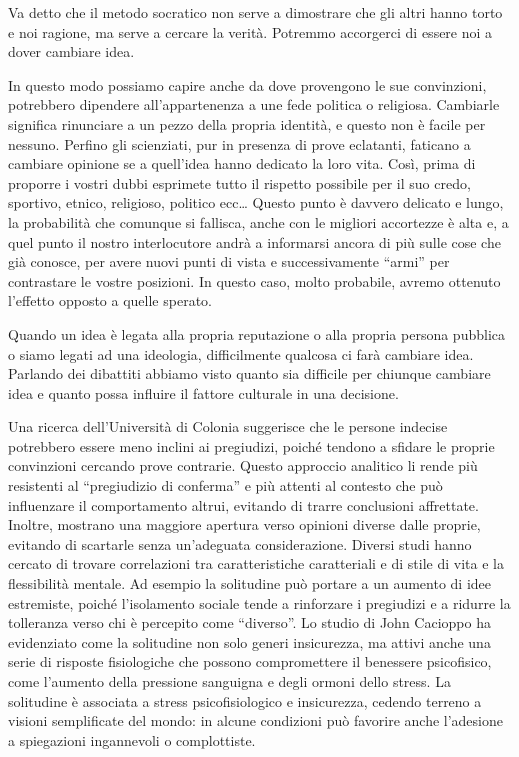 \documentclass[12pt]{book} %
\begin{document}
Va detto che il metodo socratico non serve a dimostrare che gli altri hanno torto e noi ragione, ma serve a cercare la
verità. Potremmo accorgerci di essere noi a dover cambiare idea.

In questo modo possiamo capire anche da dove provengono le sue convinzioni, potrebbero dipendere
all'appartenenza a une fede politica o religiosa. Cambiarle significa rinunciare a un pezzo della
propria identità, e questo non è facile per nessuno. Perfino gli scienziati, pur in presenza di prove eclatanti,
faticano a cambiare opinione se a quell'idea hanno dedicato la loro vita. Così, prima di proporre
i vostri dubbi esprimete tutto il rispetto possibile per il suo credo, sportivo, etnico, religioso, politico ecc…
Questo punto è davvero delicato e lungo, la probabilità che comunque si fallisca, anche con le migliori accortezze è
alta e, a quel punto il nostro interlocutore andrà a informarsi ancora di più sulle cose che già conosce, per avere
nuovi punti di vista e successivamente “armi” per contrastare le vostre posizioni. In questo caso, molto probabile,
avremo ottenuto l'effetto opposto a quelle sperato.

Quando un idea è legata alla propria reputazione o alla propria persona pubblica o siamo legati ad una ideologia, difficilmente qualcosa ci farà cambiare idea. 
Parlando dei dibattiti abbiamo visto quanto sia difficile per chiunque cambiare idea e quanto possa influire il fattore culturale in una decisione.

Una ricerca dell’Università di Colonia suggerisce che le persone indecise potrebbero essere meno inclini ai pregiudizi, poiché tendono a sfidare le proprie convinzioni cercando prove contrarie. Questo approccio analitico li rende più resistenti al “pregiudizio di conferma” e più attenti al contesto che può influenzare il comportamento altrui, evitando di trarre conclusioni affrettate. Inoltre, mostrano una maggiore apertura verso opinioni diverse dalle proprie, evitando di scartarle senza un’adeguata considerazione.
Diversi studi hanno cercato di trovare correlazioni tra caratteristiche caratteriali e di stile di vita e la flessibilità mentale. Ad esempio la solitudine può portare a un aumento di idee estremiste, poiché l’isolamento sociale tende a rinforzare i pregiudizi e a ridurre la tolleranza verso chi è percepito come “diverso”. Lo studio di John Cacioppo ha evidenziato come la solitudine non solo generi insicurezza, ma attivi anche una serie di risposte fisiologiche che possono compromettere il benessere psicofisico, come l’aumento della pressione sanguigna e degli ormoni dello stress. La solitudine è associata a stress psicofisiologico e insicurezza, cedendo terreno a visioni semplificate del mondo: in alcune condizioni può favorire anche l’adesione a spiegazioni ingannevoli o complottiste.
\end{document}
